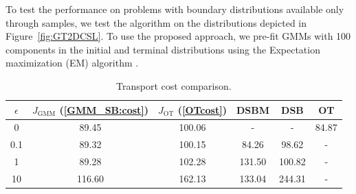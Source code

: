 \documentclass[twoside]{article}
\renewcommand{\eqref}[1]{(\ref{#1})}
\newcommand{\todo}[1]{{\color{magenta}[ToDo: #1]}}
\begin{document}
To test the performance on problems with boundary distributions available only through samples, we test the algorithm on the distributions depicted in Figure~\ref{fig:GT2DCSL}. 
To use the proposed approach, we pre-fit GMMs with 100 components in the initial and terminal distributions using the Expectation maximization (EM) algorithm \citep{pedregosa2011scikit}. 

\begin{table} [!ht]
    \caption{Transport cost comparison.}
    \label{tab:jensen_gap}
    \setlength{\tabcolsep}{3pt}
    \centering
    \begin{tabular}{|c|c|c|c|c|c|}
    \hline
        $\epsilon$ & $J_{\mathrm{GMM}}$  \eqref{GMM_SB:cost} & $ J_{\mathrm{OT}}$  \eqref{OTcost}  & DSBM & DSB & OT\\
    \hline
        0   &   89.45   & 100.06  & -  & - & 84.87 \\
    \hline
        0.1 &   89.32   & 100.15  & 84.26 & 98.62 & -\\
    \hline
        1   &   89.28   & 102.28  &  131.50 & 100.82 & -\\
    \hline
        10   &  116.60  & 162.13  & 133.04 & 244.31 & -\\
    \hline
    \end{tabular}
\end{table}
%
%
\end{document}
